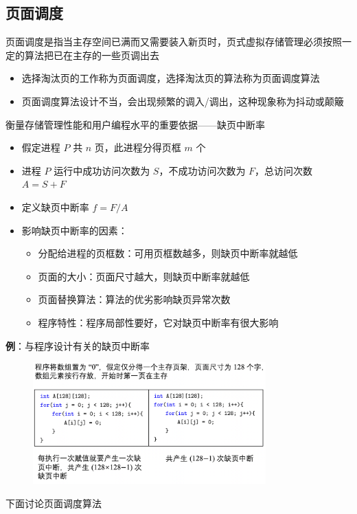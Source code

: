 \documentclass[cs4size,a4paper,10pt]{ctexart}
\begin{document}
		\subsection{页面调度}
		页面调度是指当主存空间已满而又需要装入新页时，页式虚拟存储管理必须按照一定的算法把已在主存的一些页调出去
		\begin{itemize}
			\item 选择淘汰页的工作称为页面调度，选择淘汰页的算法称为页面调度算法
			\item 页面调度算法设计不当，会出现频繁的调入/调出，这种现象称为抖动或颠簸
		\end{itemize}
		衡量存储管理性能和用户编程水平的重要依据——缺页中断率
		\begin{itemize}
			\item 假定进程 $P$ 共 $n$ 页，此进程分得页框 $m$ 个
			\item 进程 $P$ 运行中成功访问次数为 $S$，不成功访问次数为 $F$，总访问次数 $A=S+F$
			\item 定义缺页中断率  $f=F/A$
			\item 影响缺页中断率的因素：
			\begin{itemize}
				\item 分配给进程的页框数：可用页框数越多，则缺页中断率就越低
				\item 页面的大小：页面尺寸越大，则缺页中断率就越低
				\item 页面替换算法：算法的优劣影响缺页异常次数
				\item 程序特性：程序局部性要好，它对缺页中断率有很大影响
			\end{itemize}
		\end{itemize}
		\textbf{例}：与程序设计有关的缺页中断率
		\begin{figure}[H]
			\centering
			\includegraphics[width=0.8\textwidth]{img/3.3.5}
		\end{figure}

		下面讨论页面调度算法
\end{document}
